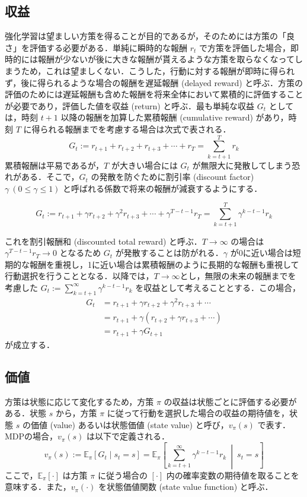 \documentclass[titlepage]{ltjsbook}
\begin{document}
\subsection{収益}
強化学習は望ましい方策を得ることが目的であるが，そのためには方策の「良さ」を評価する必要がある．単純に瞬時的な報酬 $r_t$ で方策を評価した場合，即時的には報酬が少ないが後に大きな報酬が貰えるような方策を取らなくなってしまうため，これは望ましくない．こうした，行動に対する報酬が即時に得られず，後に得られるような場合の報酬を遅延報酬 (delayed reward) と呼ぶ．方策の評価のためには遅延報酬も含めた報酬を将来全体において累積的に評価することが必要であり，評価した値を収益 (return) と呼ぶ．最も単純な収益 $G_t$ としては，時刻 $t+1$ 以降の報酬を加算した累積報酬 (cumulative reward) があり，時刻 $T$ に得られる報酬までを考慮する場合は次式で表される．
\begin{equation}
G_t := r_{t+1}+r_{t+2}+r_{t+3}+\cdots+r_T = \sum_{k=t+1}^{T}r_{k}
\end{equation}
累積報酬は平易であるが，$T$ が大きい場合には $G_t$ が無限大に発散してしまう恐れがある．そこで，$G_t$ の発散を防ぐために割引率 (discount factor) $\gamma\ (0\leq \gamma \leq 1)$ と呼ばれる係数で将来の報酬が減衰するようにする．

\begin{equation}
G_t := r_{t+1}+\gamma r_{t+2}+\gamma^2 r_{t+3}+\cdots+\gamma^{T-t-1}r_T = \sum_{k=t+1}^{T}\gamma^{k-t-1} r_{k}
\end{equation}

これを割引報酬和 (discounted total reward) と呼ぶ．$T\to \infty$ の場合は $\gamma^{T-t-1}r_T \to 0$ となるため $G_t$ が発散することは防がれる．$\gamma$ が0に近い場合は短期的な報酬を重視し，1に近い場合は累積報酬のように長期的な報酬も重視して行動選択を行うこととなる．以降では，$T\to \infty$とし，無限の未来の報酬までを考慮した $G_t:=\sum_{k=t+1}^{\infty}\gamma^{k-t-1} r_{k}$ を収益として考えることとする．この場合，
\begin{align}
G_t &= r_{t+1}+\gamma r_{t+2}+\gamma^2 r_{t+3}+\cdots\\
&=r_{t+1}+\gamma (r_{t+2}+\gamma r_{t+3}+\cdots)\\
&=r_{t+1} + \gamma G_{t+1}
\end{align} 
が成立する．

\subsection{価値}
方策は状態に応じて変化するため，方策 $\pi$ の収益は状態ごとに評価する必要がある．状態 $s$ から，方策 $\pi$ に従って行動を選択した場合の収益の期待値を，状態 $s$ の価値 (value) あるいは状態価値 (state value) と呼び，$v_\pi(s)$ で表す．MDPの場合，$v_\pi(s)$ は以下で定義される．
\begin{equation}
v_\pi(s) := \mathbb{E}_\pi \left[G_t \mid s_t = s \right]=\mathbb{E}_\pi \left[\sum_{k=t+1}^{\infty}\gamma^{k-t-1} r_{k}\ \middle|\ s_t = s \right]
\end{equation}
ここで，$\mathbb{E}_\pi \left[\cdot \right]$ は方策 $\pi$ に従う場合の $[\cdot]$ 内の確率変数の期待値を取ることを意味する．また，$v_\pi(\cdot)$ を状態価値関数 (state value function) と呼ぶ．
\end{document}
